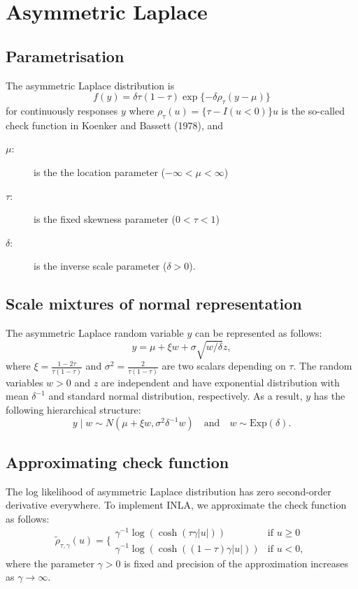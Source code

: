 \documentclass[a4paper,11pt]{article}
\begin{document}
\section*{Asymmetric Laplace}

\subsection*{Parametrisation}

The asymmetric Laplace distribution is
\begin{displaymath}
    f(y) = \delta\tau(1 - \tau)\exp\{-\delta\rho_\tau(y - \mu)\}
\end{displaymath}
for continuously responses $y$ where $\rho_\tau(u) = \{\tau - I(u<0)\}u$ is the so-called check function in Koenker and Bassett (1978), and
\begin{description}
\item[$\mu$:] is the the location parameter ($-\infty < \mu < \infty$)
\item[$\tau$:] is the fixed skewness parameter ($0<\tau<1$)
\item[$\delta$:] is the inverse scale parameter ($\delta > 0$).
\end{description}

\subsection*{Scale mixtures of normal representation}
The asymmetric Laplace random variable $y$ can be represented as follows:
\begin{displaymath}
 y = \mu + \xi w + \sigma\sqrt{w/\delta} z,
\end{displaymath}
where $\xi = \frac{1 - 2\tau}{\tau(1-\tau)}$ and $\sigma^2 = \frac{2}{\tau(1-\tau)}$ are two scalars depending on $\tau$. The random variables $w > 0$ and $z$ are independent and have exponential distribution with mean $\delta^{-1}$ and standard normal distribution, respectively. As a result, $y$ has the following hierarchical structure:
\begin{displaymath}
y\mid w\sim N\left(\mu + \xi w, \sigma^2 \delta^{-1}w\right)
\quad \mbox{and} \quad
w \sim \mbox{Exp}(\delta).
\end{displaymath}

\subsection*{Approximating check function}
The log likelihood of asymmetric Laplace distribution has zero second-order derivative everywhere. To implement INLA, we approximate the check function as follows:
\begin{displaymath}
\tilde\rho_{\tau,\gamma}(u)=\bigg\{
\begin{array}{ll}
\gamma^{-1}\log(\cosh(\tau\gamma |u|)) & \mbox{if}\,\, u\ge 0\\
\gamma^{-1}\log(\cosh((1-\tau)\gamma |u|)) & \mbox{if}\,\, u< 0,
\end{array}
\end{displaymath}
where the parameter $\gamma>0$ is fixed and precision of the approximation increases as $\gamma\rightarrow\infty$.
\end{document}
